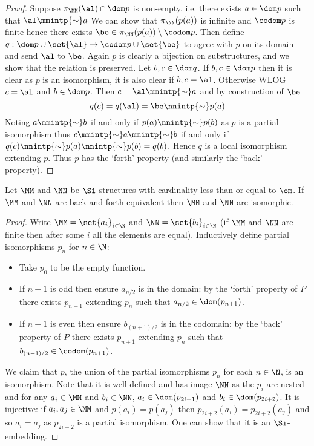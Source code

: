 \begin{proof}
    Suppose $\pi_\MM(\al) \cap \dom p$ is non-empty,
    i.e. there exists $a \in \dom p$ such that $\al \mmintp{\sim} a$
    We can show that 
    $\pi_\NN(p(a))$ is infinite and $\codom p$ is finite
    hence there exists $\be \in \pi_\NN(p(a)) \setminus \codom p$.
    Then define $q : \dom p \cup \set{\al} \to \codom p \cup \set{\be}$
    to agree with $p$ on its domain and send $\al$ to $\be$.
    Again $p$ is clearly a bijection on substructures, 
    and we show that the relation is preserved.
    Let $b,c \in \dom q$. 
    If $b,c \in \dom p$ then it is clear as $p$ is an isomorphism,
    it is also clear if $b,c = \al$.
    Otherwise WLOG $c = \al$ and $b \in \dom p$.
    Then $c = \al \mmintp{\sim} a$ and
    by construction of $\be$ 
    \[q(c) = q(\al) = \be \nnintp{\sim} p(a)\]
    Noting $a \mmintp{\sim} b$ if and only if $p(a) \nnintp{\sim} p(b)$
    as $p$ is a partial isomorphism
    thus $c \mmintp{\sim} a \mmintp{\sim} b$ 
    if and only if $q(c) \nnintp{\sim} p(a) \nnintp{\sim} p(b) = q(b)$.
    Hence $q$ is a local isomorphism extending $p$.
    Thus $p$ has the `forth' property (and similarly the `back' property).
\end{proof} 



\begin{prop}
    Let $\MM$ and $\NN$ be $\Si$-structures with
    cardinality less than or equal to $\om$.
    If $\MM$ and $\NN$ are back and forth equivalent then 
    $\MM$ and $\NN$ are isomorphic. 
\end{prop}
\begin{proof}
    Write $\MM = \set{a_i}_{i \in \N}$ and $\NN = \set{b_i}_{i \in \N}$
    (if $\MM$ and $\NN$ are finite then after some $i$ all the elements are 
    equal).
    Inductively define partial isomorphisms $p_n$ for $n \in \N$:
    \begin{itemize}
        \item Take $p_0$ to be the empty function.
        \item If $n + 1$ is odd then ensure $a_{n/2}$ 
            is in the domain:
            by the `forth' property of $P$ there exists $p_{n+1}$ 
            extending $p_n$ such that $a_{n/2} \in \dom(p_{n+1})$.
        \item If $n + 1$ is even then ensure $b_{(n+1)/2}$ is in the codomain:
            by the `back' property of $P$ there exists $p_{n+1}$ 
            extending $p_n$ such that $b_{(n-1)/2} \in \codom(p_{n+1})$.
    \end{itemize}
    We claim that $p$, the union of the partial isomorphisms 
    $p_n$ for each $n \in \N$, is an isomorphism.
    Note that it is well-defined and has image $\NN$ as the $p_i$ are nested and
    for any $a_i \in \MM$ and $b_i \in \NN$, 
    $a_i \in \dom(p_{2i+1})$ and $b_i \in \dom(p_{2i+2})$.
    It is injective: if $a_i, a_j \in \MM$ and $p(a_i) = p(a_j)$ then 
    $p_{2i+2}(a_i) = p_{2i+2}(a_j)$ and so $a_i = a_j$ as $p_{2i+2}$ is a 
    partial isomorphism.
    One can show that it is an $\Si$-embedding.
\end{proof}
